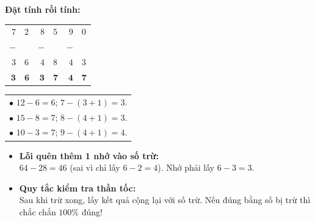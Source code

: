 \documentclass[11pt,a4paper]{article}
\begin{document}
\vspace{-1.5mm}
\noindent
\begin{minipage}[t]{0.49\textwidth}\vspace{0pt}
\begin{tcolorbox}[
  enhanced,
  colback=green!4!white,
  colframe=green!60!black,
  arc=2mm, boxrule=0.8pt,
  left=2mm, right=2mm, top=1.8mm, bottom=1.8mm,
  title={\footnotesize\bfseries\color{white}\faCheckCircle\ 4. Ví dụ thực hành chuẩn mực}
]
{\footnotesize
\textbf{Đặt tính rồi tính:}\\
\begin{tabular}{r@{\,}lr@{\,}lr@{\,}l}
  $7$ & $2$ & $8$ & $5$ & $9$ & $0$ \\
$-$ & & $-$ & & $-$ & \\
  $3$ & $6$ & $4$ & $8$ & $4$ & $3$ \\ \hline
  $\mathbf{3}$ & $\mathbf{6}$ & $\mathbf{3}$ & $\mathbf{7}$ & $\mathbf{4}$ & $\mathbf{7}$
\end{tabular}
\quad
\begin{tabular}{l}
  $\bullet$ $12 - 6 = 6$; $7 - (3+1) = 3$.\\
  $\bullet$ $15 - 8 = 7$; $8 - (4+1) = 3$.\\
  $\bullet$ $10 - 3 = 7$; $9 - (4+1) = 4$.
\end{tabular}
}
\end{tcolorbox}
\end{minipage}
\hfill
\begin{minipage}[t]{0.49\textwidth}\vspace{0pt}
\begin{tcolorbox}[
  enhanced,
  colback=red!4!white,
  colframe=red!75!black,
  arc=2mm, boxrule=0.8pt,
  left=2mm, right=2mm, top=1.8mm, bottom=1.8mm,
  title={\footnotesize\bfseries\color{white}\faExclamationTriangle\ 5. Mẹo tránh bẫy trắc nghiệm}
]
{\footnotesize
\begin{itemize}\setlength{\itemsep}{1pt}\setlength{\leftskip}{-2.5mm}
  \item \textbf{Lỗi quên thêm 1 nhớ vào số trừ:}\\
  $64 - 28 = 46$ (sai vì chỉ lấy $6 - 2 = 4$). Nhớ phải lấy $6 - 3 = 3$.
  \item \textbf{Quy tắc kiểm tra thần tốc:}\\
  Sau khi trừ xong, lấy kết quả cộng lại với số trừ. Nếu đúng bằng số bị trừ thì chắc chắn $100\%$ đúng!
\end{itemize}
}
\end{tcolorbox}
\end{minipage}
\end{document}
